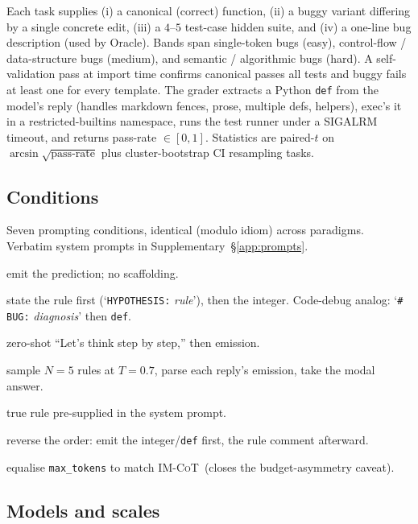 \documentclass{article}
\newcommand{\reactive}{\textsc{Reactive}}
\newcommand{\imhyp}{\textsc{IM-Hyp}}
\newcommand{\imcot}{\textsc{IM-CoT}}
\newcommand{\imorc}{\textsc{IM-Oracle}}
\newcommand{\imsc}{\textsc{IM-SC$_5$}}
\newcommand{\imfst}{\textsc{IM-First}}
\newcommand{\imeqb}{\textsc{IM-EqBudget}}
\begin{document}
Each task supplies (i) a canonical (correct) function, (ii) a
buggy variant differing by a single concrete edit, (iii) a
$4$--$5$ test-case hidden suite, and (iv) a one-line bug
description (used by Oracle).  Bands span single-token bugs
(easy), control-flow / data-structure bugs (medium), and
semantic / algorithmic bugs (hard).  A self-validation pass at
import time confirms canonical passes all tests and buggy fails
at least one for every template.  The grader extracts a Python
\verb|def| from the model's reply (handles markdown fences,
prose, multiple defs, helpers), exec's it in a
restricted-builtins namespace, runs the test runner under a
SIGALRM timeout, and returns pass-rate $\in [0, 1]$.  Statistics
are paired-$t$ on $\arcsin\sqrt{\text{pass-rate}}$ plus
cluster-bootstrap CI resampling tasks.

\subsection{Conditions}
\label{sec:method-conds}

Seven prompting conditions, identical (modulo idiom) across
paradigms.  Verbatim system prompts in
Supplementary~\S\ref{app:prompts}.

\begin{description}[leftmargin=1.2em, itemsep=1pt, topsep=2pt]
\item[\reactive\ (baseline):] emit the prediction; no scaffolding.
\item[\imhyp:] state the rule first
  (`\verb|HYPOTHESIS:| \emph{rule}'), then the integer.  Code-debug
  analog: `\verb|# BUG:| \emph{diagnosis}' then \verb|def|.
\item[\imcot:] zero-shot ``Let's think step by step,'' then
  emission.
\item[\imsc:] sample $N = 5$ rules at $T = 0.7$, parse each
  reply's emission, take the modal answer.
\item[\imorc:] true rule pre-supplied in the system prompt.
\item[\imfst:] reverse the order: emit the integer/\verb|def|
  first, the rule comment afterward.
\item[\imeqb:] equalise \verb|max_tokens| to match \imcot\
  (closes the budget-asymmetry caveat).
\end{description}

\subsection{Models and scales}
\label{sec:method-models}
\end{document}
